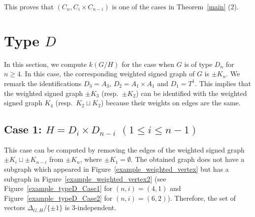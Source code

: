 \documentclass{amsart}
\theoremstyle{definition}
\theoremstyle{remark}
\numberwithin{equation}{section}
\begin{document}
This proves that $(C_{n},C_{i}\times C_{n-i})$ is one of the cases in Theorem~\ref{main} (2).

\section{Type $D$}
\label{sect:7}

In this section, we compute $k(G/H)$ for the case when $G$ is of type $D_{n}$ for $n\ge 4$.
In this case, the corresponding weighted signed graph of $G$ is $\pm K_{n}$.
We remark the identifications $D_{3}=A_{3}$, $D_{2}=A_{1}\times A_{1}$ and $D_{1}=T^{1}$.
This implies that the weighted signed graph $\pm K_{3}$ (resp.~$\pm K_{2}$) can be identified with the weighted signed graph $K_{4}$ (resp.~$K_{2}\sqcup K_{2}$) because their weights on edges are the same.

\subsection{Case 1: $H=D_{i}\times D_{n-i}$ $(1\le i\le n-1)$} 
\label{sect:7.1}

This case can be computed by removing the edges of the weighted signed graph $\pm K_{i}\sqcup \pm K_{n-i}$ from $\pm K_{n}$, where $\pm K_{1}=\emptyset$.
The obtained graph does not have a subgraph which appeared in Figure~\ref{example_weighted_vertex} but has a subgraph in Figure~\ref{example_weighted_vertex2} (see 
Figure~\ref{example_typeD_Case1} for $(n,i)=(4,1)$ and Figure~\ref{example_typeD_Case2} for $(n,i)=(6,2)$).
Therefore, the set of vectors $\Delta_{G,H}/\{\pm 1\}$ is $3$-independent.
\end{document}
